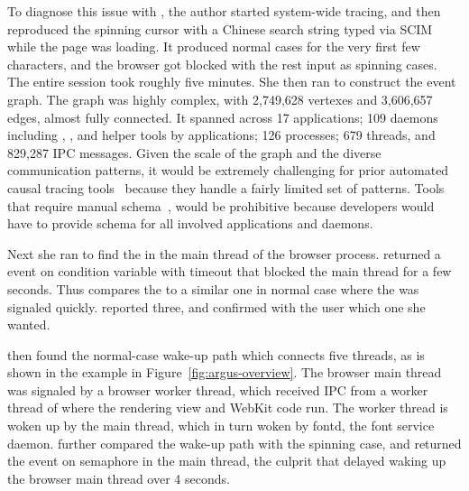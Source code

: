 To diagnose this issue with \xxx, the author started system-wide tracing, and
then reproduced the spinning cursor with a Chinese search string typed via SCIM
while the page was loading. It produced normal cases for the very first few
characters, and the browser got blocked with the rest input as spinning cases.
The entire session took roughly five minutes.
She then ran \xxx to construct the event graph. 
The graph was highly complex, with 
2,749,628 vertexes and 3,606,657 edges, almost fully connected. It spanned across 17 applications;
109 daemons including , ,  and
helper tools by applications; 126 processes; 679 threads, and 829,287
IPC messages. Given the scale of the graph and the diverse communication
patterns, it would be extremely challenging for prior automated causal tracing
tools~\cite{aguilera2003performance, zhang2013panappticon, attariyan2012x,
cohen2004correlating} because they handle a fairly limited set of patterns.
Tools that require manual schema~\cite{barham2004using, reynolds2006pip}, would
be prohibitive because developers would have to provide schema for all involved
applications and daemons.

Next she ran \xxx to find the \spinningnode in the main thread of the browser
process. \xxx returned a  event on condition variable with timeout that
blocked the main thread for a few seconds. Thus \xxx compares the \spinningnode
to a similar one in normal case where the  was signaled quickly. \xxx
reported three, and confirmed with the user which one she wanted.

\xxx then found the normal-case wake-up path which connects five threads, as is
shown in the example in Figure~\ref{fig:argus-overview}. The browser main thread
was signaled by a browser worker thread, which received IPC from a worker thread
of  where the rendering view and WebKit code run. The worker thread
is woken up by the  main thread, which in turn woken by fontd, the
font service daemon. \xxx further compared the wake-up path with the spinning
case, and returned the  event on semaphore in the  main
thread, the culprit that delayed waking up the browser main thread over 4
seconds.

